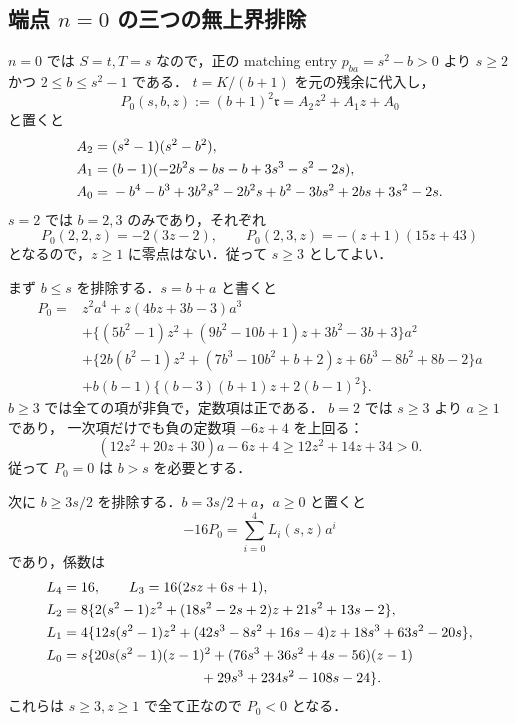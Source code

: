 \subsection{端点 \texorpdfstring{$n=0$}{n=0} の三つの無上界排除}

$n=0$ では $S=t,T=s$ なので，正の matching entry
$p_{ba}=s^2-b>0$ より $s\ge2$ かつ $2\le b\le s^2-1$ である．
$t=K/(b+1)$ を元の残余に代入し，
\[
 P_0(s,b,z):=(b+1)^2\mathfrak r
            =A_2z^2+A_1z+A_0
\]
と置くと
\begin{align}
 A_2={}&(s^2-1)(s^2-b^2),\label{hpe25:P0coeff}\\
 A_1={}&(b-1)(-2b^2s-bs-b+3s^3-s^2-2s),\notag\\
 A_0={}&-b^4-b^3+3b^2s^2-2b^2s+b^2-3bs^2+2bs+3s^2-2s.\notag
\end{align}
$s=2$ では $b=2,3$ のみであり，それぞれ
\[
 P_0(2,2,z)=-2(3z-2),\qquad
 P_0(2,3,z)=-(z+1)(15z+43)
\]
となるので，$z\ge1$ に零点はない．従って $s\ge3$ としてよい．

まず $b\le s$ を排除する．$s=b+a$ と書くと
\begin{align*}
P_0={}&z^2a^4+z(4bz+3b-3)a^3\\
 &+\{(5b^2-1)z^2+(9b^2-10b+1)z+3b^2-3b+3\}a^2\\
 &+\{2b(b^2-1)z^2+(7b^3-10b^2+b+2)z
             +6b^3-8b^2+8b-2\}a\\
 &+b(b-1)\{(b-3)(b+1)z+2(b-1)^2\}.
\end{align*}
$b\ge3$ では全ての項が非負で，定数項は正である．
$b=2$ では $s\ge3$ より $a\ge1$ であり，
一次項だけでも負の定数項 $-6z+4$ を上回る：
\[
 (12z^2+20z+30)a-6z+4\ge12z^2+14z+34>0.
\]
従って $P_0=0$ は $b>s$ を必要とする．

次に $b\ge3s/2$ を排除する．$b=3s/2+a$，$a\ge0$ と置くと
\[
 -16P_0=\sum_{i=0}^4 L_i(s,z)a^i
\]
であり，係数は
\begin{align*}
 L_4={}&16,\qquad L_3=16(2sz+6s+1),\\
 L_2={}&8\{2(s^2-1)z^2+(18s^2-2s+2)z+21s^2+13s-2\},\\
 L_1={}&4\{12s(s^2-1)z^2+(42s^3-8s^2+16s-4)z
                    +18s^3+63s^2-20s\},\\
 L_0={}&s\{20s(s^2-1)(z-1)^2
 +(76s^3+36s^2+4s-56)(z-1)\\
 &\hspace{30mm}+29s^3+234s^2-108s-24\}.
\end{align*}
これらは $s\ge3,z\ge1$ で全て正なので $P_0<0$ となる．

